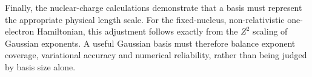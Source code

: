 Finally, the nuclear-charge calculations demonstrate that a basis must represent the appropriate
physical length scale.
For the fixed-nucleus, non-relativistic one-electron Hamiltonian, this adjustment follows exactly
from the $Z^2$ scaling of Gaussian exponents.
A useful Gaussian basis must therefore balance exponent coverage, variational accuracy and numerical
reliability, rather than being judged by basis size alone.
